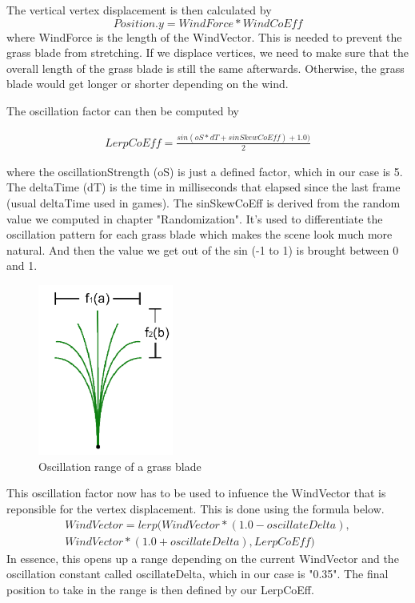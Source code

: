 \documentclass[conference]{acmsiggraph}
\begin{document}
The vertical vertex displacement is then calculated by
\begin{equation}
Position.y = WindForce * WindCoEff
\end{equation}
where WindForce is the length of the WindVector. This is needed to prevent the grass blade from stretching. If we displace vertices, we need to make sure that the overall length of the grass blade is still the same afterwards. Otherwise, the grass blade would get longer or shorter depending on the wind.

The oscillation factor can then be computed by
\begin{center}
\begin{align*}
LerpCoEff = \frac{sin(oS * dT + sinSkewCoEff) + 1.0)}{2}
\end{align*}
\end{center}
where the oscillationStrength (oS) is just a defined factor, which in our case is 5. The deltaTime (dT) is the time in milliseconds that elapsed since the last frame (usual deltaTime used in games). The sinSkewCoEff is derived from the random value we computed in chapter "Randomization". It's used to differentiate the oscillation pattern for each grass blade which makes the scene look much more natural. And then the value we get out of the sin (-1 to 1) is brought between 0 and 1.

 \begin{figure}[ht]
   \centering
   \includegraphics[width=1.75in]{images/oscillation}
   \caption{Oscillation range of a grass blade}
 \end{figure}

This oscillation factor now has to be used to infuence the WindVector that is reponsible for the vertex displacement. This is done using the formula below.
\begin{equation}
\begin{split}
WindVector = lerp(WindVector * (1.0 - oscillateDelta), \\ 
WindVector * (1.0 + oscillateDelta), LerpCoEff)
\end{split}
\end{equation}
In essence, this opens up a range depending on the current WindVector and the oscillation constant called oscillateDelta, which in our case is "0.35". The final position to take in the range is then defined by our LerpCoEff.
\end{document}
